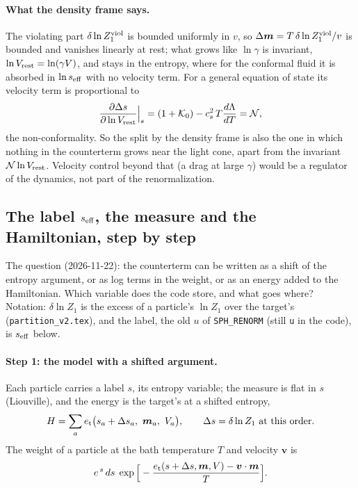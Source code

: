 \documentclass[11pt,aps,preprint,nofootinbib,superscriptaddress,tightenlines]{revtex4-2}
\def\st{\begin{equation}}
\def\stp{\end{equation}}
\let\oldparagraph\paragraph
\renewcommand{\paragraph}{\par\bigskip\oldparagraph}
\begin{document}
\paragraph{What the density frame says.}  The violating part $\delta\ln Z_1^{\rm viol}$ is bounded uniformly in $v$, so $\Delta\bm m=T\,\delta\ln Z_1^{\rm viol}/v$ is bounded and vanishes linearly at rest;
what grows like $\ln\gamma$ is invariant, $\ln V_{\rm rest}=\ln(\gamma V)$, and stays in the entropy, where for the conformal fluid it is absorbed in $\ln s_{\rm eff}$ with no velocity term.
For a general equation of state its velocity term is proportional to
\st
\frac{\partial\Delta s}{\partial\ln V_{\rm rest}}\Big|_s=(1+\mathcal K_0)-c_s^2\,T\frac{d\Lambda}{dT}=\mathcal N ,
\stp
the non-conformality.  So the split by the density frame is also the one in which nothing in the counterterm grows near the light cone, apart from the invariant
$\mathcal N\ln V_{\rm rest}$.  Velocity control beyond that (a drag at large $\gamma$) would be a regulator of the dynamics, not part of the renormalization.

\subsection{The label \texorpdfstring{$s_{\rm eff}$}{s\_eff}, the measure and the Hamiltonian, step by step}
\label{app:seff}

The question (2026-11-22): the counterterm can be written as a shift of the entropy argument, or as log terms in the weight, or as an energy added to the
Hamiltonian.  Which variable does the code store, and what goes where?  Notation: $\delta\ln Z_1$ is the excess of a particle's $\ln Z_1$ over the target's
(\nolinkurl{partition_v2.tex}), and the label, the old $u$ of \texttt{SPH\_RENORM} (still \texttt{u} in the code), is $s_{\rm eff}$ below.

\paragraph{Step 1: the model with a shifted argument.}  Each particle carries a label $s$, its entropy variable; the measure is flat in $s$ (Liouville), and the energy is
the target's at a shifted entropy,
\st
H=\sum_a e_{\rm t}\big(s_a+\Delta s_a,\ \bm m_a,\ V_a\big),\qquad \Delta s=\delta\ln Z_1\ \text{at this order} .
\stp
The weight of a particle at the bath temperature $T$ and velocity $\bm v$ is
\st
e^{\,s}\,ds\;\exp\Big[-\frac{e_{\rm t}(s+\Delta s,\bm m,V)-\bm v\cdot\bm m}{T}\Big] .
\stp
\end{document}

